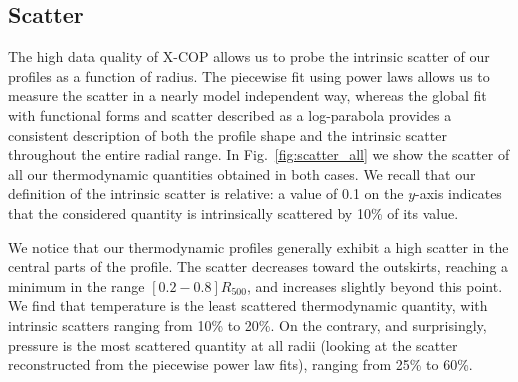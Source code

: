 \documentclass[traditabstract   ]{aa} %
\begin{document}
\subsection{Scatter}
\label{sec:scatter}
The high data quality of X-COP allows us to probe the intrinsic scatter of our profiles as a function of radius. The piecewise fit using power laws allows us to measure the scatter in a nearly model independent way, whereas the global fit with functional forms and scatter described as a log-parabola provides a consistent description of both the profile shape and the intrinsic scatter throughout the entire radial range.
In Fig.~\ref{fig:scatter_all} we show the scatter of all our thermodynamic quantities obtained in both cases.
We recall that our definition of the intrinsic scatter is relative: a value of 0.1 on the $y$-axis indicates that the considered quantity is intrinsically scattered by 10\% of its value.

We notice that our thermodynamic profiles generally exhibit a high scatter in the central parts of the profile. The scatter decreases toward the outskirts, reaching a minimum in the range $[0.2 - 0.8] R_{500}$, and increases slightly beyond this point. We find that temperature is the least scattered thermodynamic quantity, with intrinsic scatters ranging from 10\% to 20\%. On the contrary, and surprisingly, pressure is the most scattered quantity at all radii (looking at the scatter reconstructed from the piecewise power law fits), ranging from 25\% to 60\%. 
\end{document}
